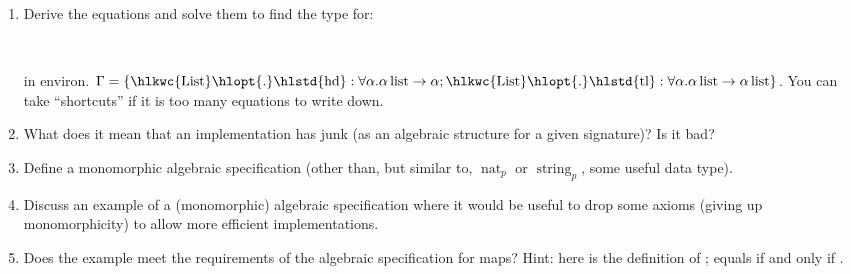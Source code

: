 \documentclass{beamer}
\newcommand{\tmop}[1]{\ensuremath{\operatorname{#1}}}
\newcommand{\tmverbatim}[1]{\text{{\ttfamily{#1}}}}
\begin{document}
\begin{enumerate}
  \item Derive the equations and solve them to find the type for:
  
  {}{}{\hlopt{=
  }}{}{}{}{\hlopt{(}}{}{}{}{\hlopt{) }}{}\\
  {}{\hlopt{(}}{}{\hlopt{::}}{}{\hlopt{::[]),
  }}{}{\hlopt{(}}{}{\hlopt{::}}{}{\hlopt{::[])}}
  
  in environ. $\Gamma = \left\{ \text{{\hlkwc{List}}{\hlopt{.}}{\hlstd{hd}}} :
  \forall \alpha . \alpha \tmop{list} \rightarrow \alpha ;
  \text{{\hlkwc{List}}{\hlopt{.}}{\hlstd{tl}}} : \forall \alpha . \alpha
  \tmop{list} \rightarrow \alpha \tmop{list} \right\}$. You can take
  ``shortcuts'' if it is too many equations to write down.
  
  \item What does it mean that an implementation has junk (as an algebraic
  structure for a given signature)? Is it bad?
  
  \item Define a monomorphic algebraic specification (other than, but similar
  to, $\tmop{nat}_p$ or $\tmop{string}_p$, some useful data type).
  
  \item Discuss an example of a (monomorphic) algebraic specification where it
  would be useful to drop some axioms (giving up monomorphicity) to allow more
  efficient implementations.
  
  \item Does the example {} meet the requirements of the
  algebraic specification for maps? Hint: here is the definition of
  {}{}{};
  \tmverbatim{compare a x} equals {} if and only if
  \tmverbatim{a}{\hlopt{ = }}\tmverbatim{x}.
  
  {\small{{}{}{\hlopt{=
  }}{}{\hlendline{}}\\
  {\hlstd{ \ }}{\hlopt{\textbar  [] -> []}}{\hlendline{}}\\
  {\hlstd{ \ }}{\hlopt{\textbar  (}}{}{\hlopt{, }}{}{}{}{\hlopt{) :: }}{}{\hlopt{->}}{\hlendline{}}\\
  {\hlstd{ \ \ \ \ \ }}{}{}{\hlopt{=
  }}{}{}{}{}{}{\hlopt{:: }}{}{\hlendline{}}}}
  

\end{enumerate}
\end{document}
